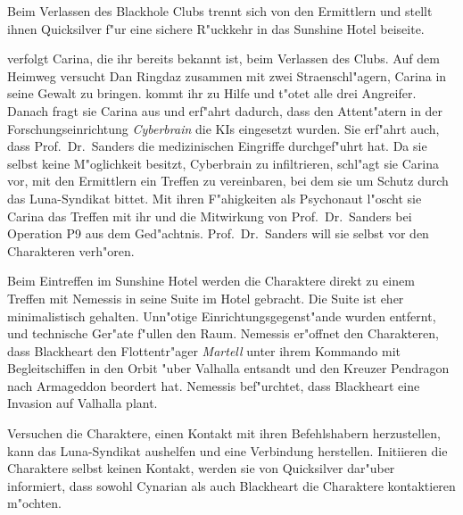

Beim Verlassen des Blackhole Clubs trennt sich \xl{} von den Ermittlern und stellt ihnen Quicksilver f"ur eine sichere R"uckkehr in das Sunshine Hotel beiseite.

\xl{} verfolgt Carina, die ihr bereits bekannt ist, beim Verlassen des Clubs. Auf dem Heimweg versucht Dan Ringdaz zusammen mit zwei Stra\3enschl"agern, Carina in seine Gewalt zu bringen. \xl{} kommt ihr zu Hilfe und t"otet alle drei Angreifer. Danach fragt sie Carina aus und erf"ahrt dadurch, dass den Attent"atern in der Forschungseinrichtung \emph{Cyberbrain} die KIs eingesetzt wurden. Sie erf"ahrt auch, dass Prof.~Dr.~Sanders die medizinischen Eingriffe durchgef"uhrt hat. Da sie selbst keine M"oglichkeit besitzt, Cyberbrain zu infiltrieren, schl"agt sie Carina vor, mit den Ermittlern ein Treffen zu vereinbaren, bei dem sie um Schutz durch das Luna-Syndikat bittet. Mit ihren F"ahigkeiten als Psychonaut l"oscht sie Carina das Treffen mit ihr und die Mitwirkung von Prof.~Dr.~Sanders bei Operation P9 aus dem Ged"achtnis. Prof.~Dr.~Sanders will sie selbst vor den Charakteren verh"oren.


Beim Eintreffen im Sunshine Hotel werden die Charaktere direkt zu einem Treffen mit Nemessis in seine Suite im Hotel gebracht. Die Suite ist eher minimalistisch gehalten. Unn"otige Einrichtungsgegenst"ande wurden entfernt, und technische Ger"ate f"ullen den Raum. Nemessis er"offnet den Charakteren, dass Blackheart den Flottentr"ager \emph{Martell} unter ihrem Kommando mit Begleitschiffen in den Orbit "uber Valhalla entsandt und den Kreuzer Pendragon nach Armageddon beordert hat. Nemessis bef"urchtet, dass Blackheart eine Invasion auf Valhalla plant.

Versuchen die Charaktere, einen Kontakt mit ihren Befehlshabern herzustellen, kann das Luna-Syndikat aushelfen und eine Verbindung herstellen. Initiieren die Charaktere selbst keinen Kontakt, werden sie von Quicksilver dar"uber informiert, dass sowohl Cynarian als auch Blackheart die Charaktere kontaktieren m"ochten.


